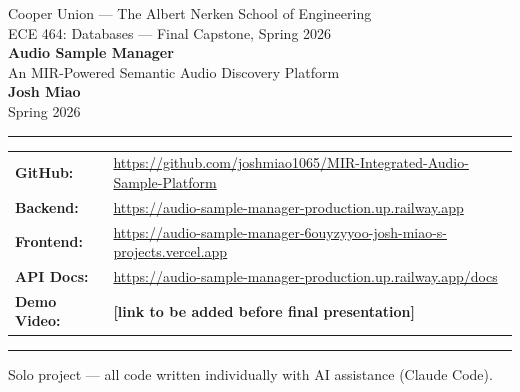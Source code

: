 \documentclass[12pt,letterpaper]{report}
\begin{document}

\begin{titlepage}
  \centering
  \vspace*{1.5cm}

  {\large Cooper Union --- The Albert Nerken School of Engineering}\\[0.4cm]
  {\large ECE 464: Databases --- Final Capstone, Spring 2026}\\[2cm]

  {\Huge\bfseries Audio Sample Manager}\\[0.6cm]
  {\Large An MIR-Powered Semantic Audio Discovery Platform}\\[2.5cm]

  {\large\bfseries Josh Miao}\\[0.4cm]
  {\large Spring 2026}\\[2cm]

  \hrule\vspace{0.5cm}
  \begin{tabular}{ll}
    \textbf{GitHub:}   & \url{https://github.com/joshmiao1065/MIR-Integrated-Audio-Sample-Platform} \\[4pt]
    \textbf{Backend:}  & \url{https://audio-sample-manager-production.up.railway.app} \\[4pt]
    \textbf{Frontend:} & \url{https://audio-sample-manager-6ouyzyyoo-josh-miao-s-projects.vercel.app} \\[4pt]
    \textbf{API Docs:} & \url{https://audio-sample-manager-production.up.railway.app/docs} \\[4pt]
    \textbf{Demo Video:} & \textbf{[link to be added before final presentation]} \\
  \end{tabular}
  \vspace{0.5cm}
  \hrule

  \vfill
  {\small Solo project --- all code written individually with AI assistance (Claude Code).}
\end{titlepage}

\tableofcontents
\newpage

\end{document}
